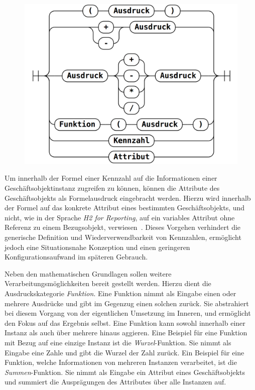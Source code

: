 \documentclass[
  language=german, %
  type=bachelor%
]{isthesis}
\begin{document}
\begin{content}
  \begin{figure}[caption={Ausdruck Syntaxdiagramm}, label={railroad-kennzahl}]
    \includegraphics[scale=0.25]{content/figures/railroad-kennzahl.png}
  \end{figure}

	Um innerhalb der Formel einer Kennzahl auf die Informationen einer
	Geschäftsobjektinstanz zugreifen zu können, können die Attribute des
	Geschäftsobjekts als Formelausdruck eingebracht werden. Hierzu wird innerhalb
	der Formel auf das konkrete Attribut eines bestimmten Geschäftsobjekts,
	und nicht, wie in der Sprache \textit{H2 for Reporting}, auf ein
	variables Attribut ohne Referenz zu einem Bezugsobjekt, verwiesen~\cite[][S.
	20]{becker2007h2}. Dieses Vorgehen verhindert die generische Definition und
	Wiederverwendbarkeit von Kennzahlen, ermöglicht jedoch eine Situationsnahe
	Konzeption und einen geringeren Konfigurationsaufwand im späteren Gebrauch.

	Neben den mathematischen Grundlagen sollen weitere Verarbeitungsmöglichkeiten
	bereit gestellt werden. Hierzu dient die Ausdruckskategorie
	\textit{Funktion}. Eine Funktion nimmt als Eingabe einen oder mehrere
	Ausdrücke und gibt im Gegenzug einen solchen zurück. Sie abstrahiert bei
	diesem Vorgang von der eigentlichen Umsetzung im Inneren, und ermöglicht den
	Fokus auf das Ergebnis selbst. Eine Funktion kann sowohl innerhalb einer
	Instanz als auch über mehrere hinaus aggieren. Eine Beispiel für eine
	Funktion mit Bezug auf eine einzige Instanz ist die \textit{Wurzel}-Funktion.
	Sie nimmt als Eingabe eine Zahle und gibt die Wurzel der Zahl zurück. Ein
	Beispiel für eine Funktion, welche Informationen von mehreren Instanzen
	verarbeitet, ist die \textit{Summen}-Funktion. Sie nimmt als Eingabe ein
	Attribut eines Geschäftsobjekts und summiert die Ausprägungen des Attributes
	über alle Instanzen auf. 


\end{content}
\end{document}
